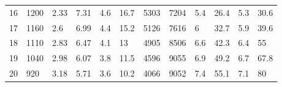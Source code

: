 \documentclass[12pt, a4paper]{article}
\begin{document}
\begin{table}
\begin{tabular}[p]{| M{1cm} | M{1.5cm} | M{1.5cm} | M{1.5cm} | M{1.5cm} | M{1.5cm} | M{1.5cm} | M{1.5cm} | M{1.5cm} | M{1.5cm} | M{1.5cm} | M{1.5cm} |}
            16 & 1200 & 2.33 & 7.31 & 4.6 & 16.7 & 5303 & 7204 & 5.4 & 26.4 & 5.3 & 30.6 \\
            17 & 1160 & 2.6 & 6.99 & 4.4 & 15.2 & 5126 & 7616 & 6 & 32.7 & 5.9 & 39.6 \\
            18 & 1110 & 2.83 & 6.47 & 4.1 & 13 & 4905 & 8506 & 6.6 & 42.3 & 6.4 & 55 \\
            19 & 1040 & 2.98 & 6.07 & 3.8 & 11.5 & 4596 & 9055 & 6.9 & 49.2 & 6.7 & 67.8 \\
            20 & 920 & 3.18 & 5.71 & 3.6 & 10.2 & 4066 & 9052 & 7.4 & 55.1 & 7.1 & 80 \\
            \hline
        \end{tabular}
        \label{tb2}
    \end{table}
    
\end{document}
